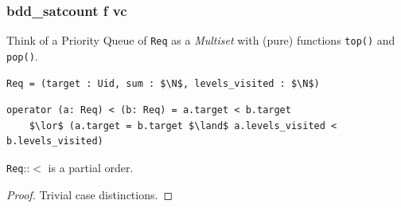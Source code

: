 \documentclass[english, aspectratio=169]{beamer}
\begin{document}
\begin{frame}[t, fragile]
  \frametitle{bdd\_satcount f vc}

  Think of a Priority Queue of \texttt{Req} as a \emph{Multiset} with (pure) functions
  \texttt{top()} and \texttt{pop()}.

  \begin{lstlisting}
Req = (target : Uid, sum : $\N$, levels_visited : $\N$)
  \end{lstlisting}
  \begin{lstlisting}[firstnumber=2]
operator (a: Req) < (b: Req) = a.target < b.target
    $\lor$ (a.target = b.target $\land$ a.levels_visited < b.levels_visited)
  \end{lstlisting}

  \begin{lemma}
    \texttt{Req}::$<$ is a partial order.
  \end{lemma}
  \begin{proof}
    Trivial case distinctions.
  \end{proof}
\end{frame}
\end{document}
